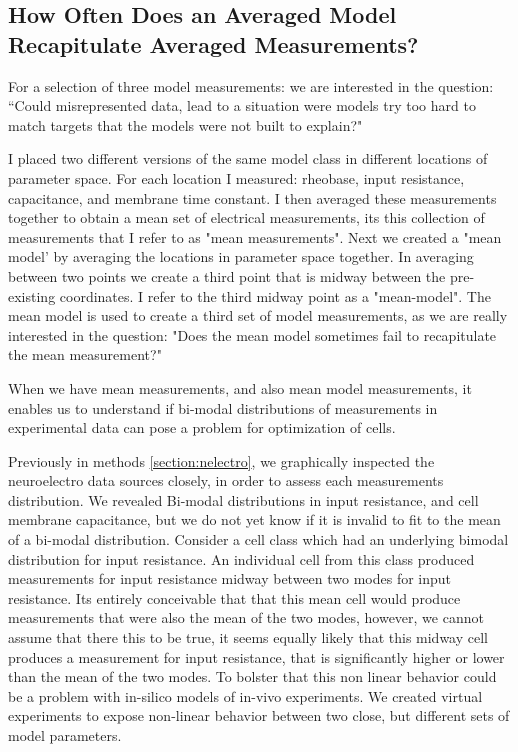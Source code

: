 \subsection{How Often Does an Averaged Model Recapitulate Averaged Measurements?}
For a selection of three model measurements: we are interested in the question: ``Could misrepresented data, lead to a situation were models try too hard to match targets that the models were not built to explain?" %

I placed two different versions of the same  model class in different locations of parameter space. For each location I measured: rheobase, input resistance, capacitance, and membrane time constant.
I then averaged these measurements together to obtain a mean set of electrical measurements, its this collection of measurements that I refer to as "mean measurements". Next we created a "mean model' by averaging the locations in parameter space together.
In averaging between two points we create a third point that is midway between the pre-existing coordinates. I refer to the third midway point as a "mean-model".
The mean model is used to create a third set of model measurements, as we are really interested in the question: "Does the mean model sometimes fail to recapitulate the mean measurement?"


When we have mean measurements, and also mean model measurements, it enables us to understand if bi-modal distributions of measurements in experimental data can pose a problem for optimization of cells.

Previously in methods \ref{section:nelectro}, we graphically inspected the neuroelectro data sources closely, in order to assess each measurements distribution.
We revealed Bi-modal distributions in input resistance, and cell membrane capacitance, but we do not yet know if it is invalid to fit to the mean of a bi-modal distribution.
Consider a  cell class which had an underlying bimodal distribution for input resistance. An individual cell from this class produced measurements for input resistance midway between two modes for input resistance.
Its entirely conceivable that that this mean cell would produce measurements that were also the mean of the two modes, however, we cannot assume that there this to be true, it seems equally likely that this midway cell produces a measurement for input resistance, that is significantly higher or lower than the mean of the two modes. To bolster that this non linear behavior could be a problem with in-silico models of in-vivo experiments.
We created virtual experiments to expose non-linear behavior between two  close, but different sets of model parameters.

